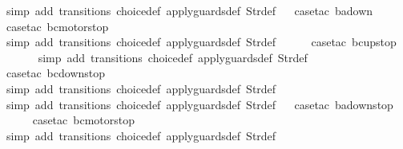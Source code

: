 \begin{isabellebody}
\ {\isacharparenleft}simp\ add{\isacharcolon}\ transitions\ choice{\isacharunderscore}def\ apply{\isacharunderscore}guards{\isacharunderscore}def\ Str{\isacharunderscore}def{\isacharparenright}\isanewline
\ \isamarkupfalse%
\ {\isacharparenleft}case{\isacharunderscore}tac\ {\isachardoublequoteopen}ba{\isacharequal}down{}{}{\isachardoublequoteclose}{\isacharparenright}\isanewline
\ \ \ \ \isamarkupfalse%
\ {\isacharparenleft}case{\isacharunderscore}tac\ {\isachardoublequoteopen}bc{\isacharequal}motorstop{}{\isachardoublequoteclose}{\isacharparenright}\isanewline
\ \ \ \ \ \isamarkupfalse%
\ {\isacharparenleft}simp\ add{\isacharcolon}\ transitions\ choice{\isacharunderscore}def\ apply{\isacharunderscore}guards{\isacharunderscore}def\ Str{\isacharunderscore}def{\isacharparenright}\isanewline
\ \ \ \ \isamarkupfalse%
\ {\isacharparenleft}case{\isacharunderscore}tac\ {\isachardoublequoteopen}bc{\isacharequal}up{}{}stop{\isachardoublequoteclose}{\isacharparenright}\isanewline
\ \ \ \ \ \isamarkupfalse%
\ {\isacharparenleft}simp\ add{\isacharcolon}\ transitions\ choice{\isacharunderscore}def\ apply{\isacharunderscore}guards{\isacharunderscore}def\ Str{\isacharunderscore}def{\isacharparenright}\isanewline
\ \ \ \ \isamarkupfalse%
\ {\isacharparenleft}case{\isacharunderscore}tac\ {\isachardoublequoteopen}bc{\isacharequal}down{}{}stop{\isachardoublequoteclose}{\isacharparenright}\isanewline
\ \ \ \ \ \isamarkupfalse%
\ {\isacharparenleft}simp\ add{\isacharcolon}\ transitions\ choice{\isacharunderscore}def\ apply{\isacharunderscore}guards{\isacharunderscore}def\ Str{\isacharunderscore}def{\isacharparenright}\isanewline
\ \ \isamarkupfalse%
\ {\isacharparenleft}simp\ add{\isacharcolon}\ transitions\ choice{\isacharunderscore}def\ apply{\isacharunderscore}guards{\isacharunderscore}def\ Str{\isacharunderscore}def{\isacharparenright}\isanewline
\ \isamarkupfalse%
\ {\isacharparenleft}case{\isacharunderscore}tac\ {\isachardoublequoteopen}ba{\isacharequal}down{}{}stop{\isachardoublequoteclose}{\isacharparenright}\isanewline
\ \ \ \ \isamarkupfalse%
\ {\isacharparenleft}case{\isacharunderscore}tac\ {\isachardoublequoteopen}bc{\isacharequal}motorstop{}{\isachardoublequoteclose}{\isacharparenright}\isanewline
\ \ \ \ \ \isamarkupfalse%
\ {\isacharparenleft}simp\ add{\isacharcolon}\ transitions\ choice{\isacharunderscore}def\ apply{\isacharunderscore}guards{\isacharunderscore}def\ Str{\isacharunderscore}def{\isacharparenright}\isanewline

\end{isabellebody}
